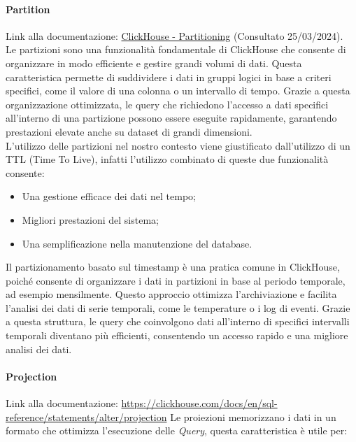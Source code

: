 \paragraph{Partition}\label{sec:Partition}
Link alla documentazione: \href{https://clickhouse.com/docs/en/engines/table-engines/mergetree-family/mergetree#partition-by}{ClickHouse - Partitioning} (Consultato 25/03/2024).\\
Le partizioni sono una funzionalità fondamentale di ClickHouse che consente di organizzare in modo efficiente e gestire grandi volumi di dati. Questa caratteristica permette di suddividere i dati in gruppi logici in base a criteri specifici, come il valore di una colonna o un intervallo di tempo. Grazie a questa organizzazione ottimizzata, le query che richiedono l'accesso a dati specifici all'interno di una partizione possono essere eseguite rapidamente, garantendo prestazioni elevate anche su dataset di grandi dimensioni.\\
L'utilizzo delle partizioni nel nostro contesto viene giustificato dall'utilizzo di un TTL (Time To Live), infatti l'utilizzo combinato di queste due funzionalità consente:
\begin{itemize}
    \item Una gestione efficace dei dati nel tempo;
    \item Migliori prestazioni del sistema;
    \item Una semplificazione nella manutenzione del database.
\end{itemize}
Il partizionamento basato sul timestamp è una pratica comune in ClickHouse, poiché consente di organizzare i dati in partizioni in base al periodo temporale, ad esempio mensilmente. Questo approccio ottimizza l'archiviazione e facilita l'analisi dei dati di serie temporali, come le temperature o i log di eventi. Grazie a questa struttura, le query che coinvolgono dati all'interno di specifici intervalli temporali diventano più efficienti, consentendo un accesso rapido e una migliore analisi dei dati.




    
\paragraph{Projection}\label{sec:projections}
Link alla documentazione: \href{https://clickhouse.com/docs/en/sql-reference/statements/alter/projection}{https://clickhouse.com/docs/en/sql-reference/statements/alter/projection}\newline
Le proiezioni memorizzano i dati in un formato che ottimizza l'esecuzione delle \textit{Query}, questa caratteristica è utile per:

